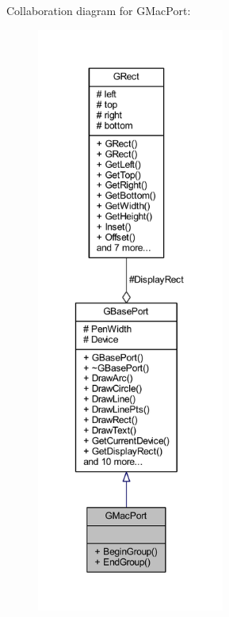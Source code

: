 Collaboration diagram for G\+Mac\+Port\+:\nopagebreak
\begin{figure}[H]
\begin{center}
\leavevmode
\includegraphics[height=550pt]{class_g_mac_port__coll__graph}
\end{center}
\end{figure}
